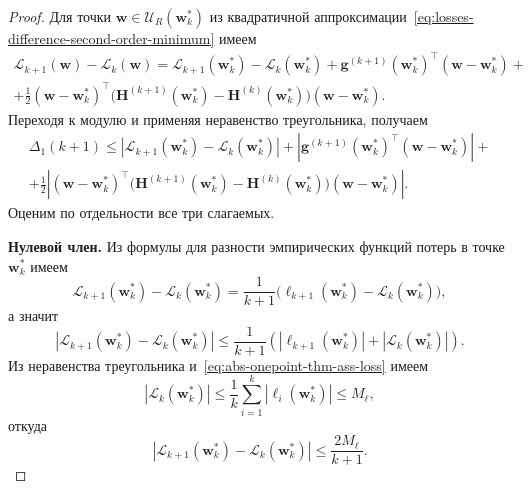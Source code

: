 \begin{proof}
    Для точки $\mathbf w \in \mathcal U_R(\mathbf w_k^*)$ из квадратичной аппроксимации~\eqref{eq:losses-difference-second-order-minimum} имеем
    \begin{multline}
        \mathcal L_{k+1}(\mathbf w)-\mathcal L_k(\mathbf w)
        =
        \mathcal L_{k+1}(\mathbf w_k^*)-\mathcal L_k(\mathbf w_k^*)
        +
        \mathbf g^{(k+1)}(\mathbf w_k^*)^\top(\mathbf w-\mathbf w_k^*)
        +
        \\
        +
        \frac12
        (\mathbf w-\mathbf w_k^*)^\top
        \Big(
            \mathbf H^{(k+1)}(\mathbf w_k^*)
            -
            \mathbf H^{(k)}(\mathbf w_k^*)
        \Big)
        (\mathbf w-\mathbf w_k^*).
    \end{multline}
    Переходя к модулю и применяя неравенство треугольника, получаем
    \begin{multline}
        \Delta_1(k+1)
        \leqslant
        \left|
            \mathcal L_{k+1}(\mathbf w_k^*)
            -
            \mathcal L_k(\mathbf w_k^*)
        \right|
        +
        \left|
            \mathbf g^{(k+1)}(\mathbf w_k^*)^\top
            (\mathbf w-\mathbf w_k^*)
        \right|
        +
        \\
        +
        \frac12
        \left|
            (\mathbf w-\mathbf w_k^*)^\top
            \Big(
                \mathbf H^{(k+1)}(\mathbf w_k^*)
                -
                \mathbf H^{(k)}(\mathbf w_k^*)
            \Big)
            (\mathbf w-\mathbf w_k^*)
        \right|.
    \end{multline}
    Оценим по отдельности все три слагаемых.

    \textbf{Нулевой член.} Из формулы для разности эмпирических функций потерь в точке $\mathbf w_k^*$ имеем
    \begin{equation}
        \mathcal L_{k+1}(\mathbf w_k^*)-\mathcal L_k(\mathbf w_k^*)
        =
        \frac{1}{k+1}
        \Big(
            \ell_{k+1}(\mathbf w_k^*)-\mathcal L_k(\mathbf w_k^*)
        \Big),
    \end{equation}
    а значит
    \begin{equation}
        \left|
            \mathcal L_{k+1}(\mathbf w_k^*)-\mathcal L_k(\mathbf w_k^*)
        \right|
        \leqslant
        \frac{1}{k+1}
        \left(
            |\ell_{k+1}(\mathbf w_k^*)|
            +
            |\mathcal L_k(\mathbf w_k^*)|
        \right).
    \end{equation}
    Из неравенства треугольника и~\eqref{eq:abs-onepoint-thm-ass-loss} имеем
    \begin{equation}
        |\mathcal L_k(\mathbf w_k^*)|
        \leqslant
        \frac{1}{k}\sum_{i=1}^k |\ell_i(\mathbf w_k^*)|
        \leqslant
        M_\ell,
    \end{equation}
    откуда
    \begin{equation}
        \label{eq:abs-onepoint-zeroth}
        \left|
            \mathcal L_{k+1}(\mathbf w_k^*)-\mathcal L_k(\mathbf w_k^*)
        \right|
        \leqslant
        \frac{2M_\ell}{k+1}.
    \end{equation}


\end{proof}
